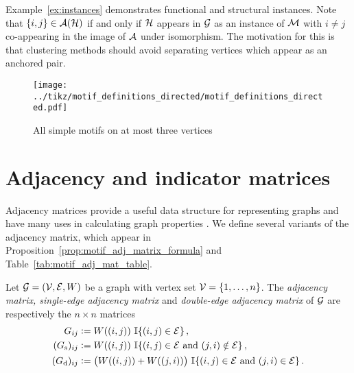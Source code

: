\begin{remark}
Example~\ref{ex:instances} demonstrates functional and structural instances. Note that $\{i,j\} \in \mathcal{A(H)}$ if and only if $\mathcal{H}$ appears in $\mathcal{G}$ as an instance of $\mathcal{M}$ with $i \neq j$ co-appearing in the image of $\mathcal{A}$ under isomorphism. The motivation for this is that clustering methods should avoid separating vertices which appear as an anchored pair.
\end{remark}

\begin{figure}[H]
	\centering
	\texttt{[image: ../tikz/motif\_definitions\_directed/motif\_definitions\_directed.pdf]}
	\caption{All simple motifs on at most three vertices}
	\label{fig:motif_definitions_directed}
\end{figure}











\section{Adjacency and indicator matrices} \label{sec:graphs_adj_and_ind_matrices}

Adjacency matrices provide a useful data structure for representing graphs and have many uses in calculating graph properties \cite{bapat2010graphs}.  We define several variants of the adjacency matrix, which appear in Proposition~\ref{prop:motif_adj_matrix_formula} and Table~\ref{tab:motif_adj_mat_table}.

\begin{definition}
Let $\mathcal{G} = (\mathcal{V,E},W)$ be a graph with vertex set $\mathcal{V} = \{1, \ldots, n \}$. The \emph{adjacency matrix, single-edge adjacency matrix} and \emph{double-edge adjacency matrix} of $\mathcal{G}$ are respectively the $n \times n$ matrices
\begin{align*}
	G_{ij} &\vcentcolon= W((i,j)) \ \mathbb{I} \{ (i,j) \in \mathcal{E} \}\,, \\
	(G_\mathrm{s})_{ij} &\vcentcolon= W((i,j)) \ \mathbb{I} \{ (i,j) \in \mathcal{E} \textrm{ and } (j,i) \notin \mathcal{E} \}\,, \\
	(G_\mathrm{d})_{ij} &\vcentcolon= \big( W((i,j)) + W((j,i)) \big) \ \mathbb{I} \{ (i,j) \in \mathcal{E} \textrm{ and } (j,i) \in \mathcal{E} \}\,. 
\end{align*}
\end{definition}


